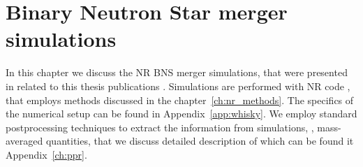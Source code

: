 \chapter{Binary Neutron Star merger simulations} \label{ch:bns_sims}

In this chapter we discuss the \ac{NR} \ac{BNS} merger simulations, 
that were presented in related to this thesis publications 
\citet{Nedora:2019jhl,Nedora:2020pak,Nedora:2021eoj}.
%
Simulations are performed with \ac{NR} code \wisky{}, that employs 
methods discussed in the chapter~\ref{ch:nr_methods}. The specifics 
of the numerical setup can be found in Appendix~\ref{app:whisky}.
%
We employ standard postprocessing techniques to extract the information 
from simulations, \eg, mass-averaged quantities, that we discuss 
detailed description of which can be found it Appendix~\ref{ch:ppr}.
%












